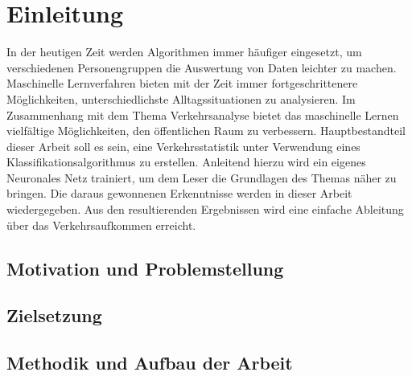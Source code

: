 
\chapter{Einleitung}

In der heutigen Zeit werden Algorithmen immer häufiger eingesetzt, um verschiedenen Personengruppen die Auswertung von Daten leichter zu machen. Maschinelle Lernverfahren bieten mit der Zeit immer fortgeschrittenere Möglichkeiten, unterschiedlichste Alltagssituationen zu analysieren. Im Zusammenhang mit dem Thema Verkehrsanalyse bietet das maschinelle Lernen vielfältige Möglichkeiten, den öffentlichen Raum zu verbessern. Hauptbestandteil dieser Arbeit soll es sein, eine Verkehrsstatistik unter Verwendung eines Klassifikationsalgorithmus zu erstellen. Anleitend hierzu wird ein eigenes Neuronales Netz trainiert, um dem Leser die Grundlagen des Themas näher zu bringen. Die daraus gewonnenen Erkenntnisse werden in dieser Arbeit wiedergegeben. Aus den resultierenden Ergebnissen wird eine einfache Ableitung über das Verkehrsaufkommen erreicht. 

\section{Motivation und Problemstellung}



\section{Zielsetzung}



\section{Methodik und Aufbau der Arbeit}


